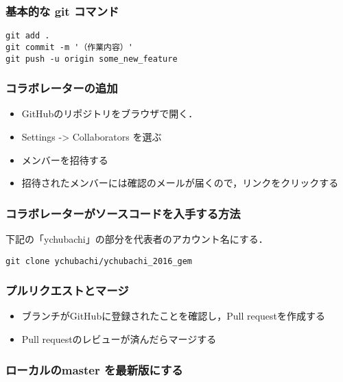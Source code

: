 \documentclass[a4paper,twoside,twocolumn]{bxjsarticle}
\begin{document}
\subsubsection{基本的な git コマンド}
\label{sec-3-1-1}

\begin{verbatim}
git add .
git commit -m '（作業内容）'
git push -u origin some_new_feature
\end{verbatim}


\subsubsection{コラボレーターの追加}
\label{sec-3-1-2}

\begin{itemize}
\item GitHubのリポジトリをブラウザで開く．
\item Settings -> Collaborators を選ぶ
\item メンバーを招待する
\item 招待されたメンバーには確認のメールが届くので，リンクをクリックする
\end{itemize}

\subsubsection{コラボレーターがソースコードを入手する方法}
\label{sec-3-1-3}

下記の「ychubachi」の部分を代表者のアカウント名にする．
\begin{verbatim}
git clone ychubachi/ychubachi_2016_gem
\end{verbatim}

\subsubsection{プルリクエストとマージ}
\label{sec-3-1-4}

\begin{itemize}
\item ブランチがGitHubに登録されたことを確認し，Pull requestを作成する
\item Pull requestのレビューが済んだらマージする
\end{itemize}

\subsubsection{ローカルのmaster を最新版にする}
\label{sec-3-1-5}
\end{document}

